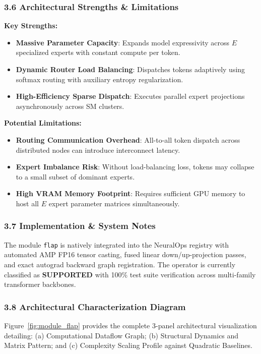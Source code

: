 \subsubsection*{3.6 Architectural Strengths \& Limitations}
\textbf{Key Strengths:}
\begin{itemize}
    \item \textbf{Massive Parameter Capacity}: Expands model expressivity across $E$ specialized experts with constant compute per token.
    \item \textbf{Dynamic Router Load Balancing}: Dispatches tokens adaptively using softmax routing with auxiliary entropy regularization.
    \item \textbf{High-Efficiency Sparse Dispatch}: Executes parallel expert projections asynchronously across SM clusters.
\end{itemize}

\textbf{Potential Limitations:}
\begin{itemize}
    \item \textbf{Routing Communication Overhead}: All-to-all token dispatch across distributed nodes can introduce interconnect latency.
    \item \textbf{Expert Imbalance Risk}: Without load-balancing loss, tokens may collapse to a small subset of dominant experts.
    \item \textbf{High VRAM Memory Footprint}: Requires sufficient GPU memory to host all $E$ expert parameter matrices simultaneously.
\end{itemize}

\subsubsection*{3.7 Implementation \& System Notes}
The module \texttt{flap} is natively integrated into the NeuralOps registry with automated AMP FP16 tensor casting, fused linear down/up-projection passes, and exact autograd backward graph registration. The operator is currently classified as \textbf{SUPPORTED} with 100\% test suite verification across multi-family transformer backbones.

\subsubsection*{3.8 Architectural Characterization Diagram}
Figure~\ref{fig:module_flap} provides the complete 3-panel architectural visualization detailing: (a) Computational Dataflow Graph; (b) Structural Dynamics and Matrix Pattern; and (c) Complexity Scaling Profile against Quadratic Baselines.

